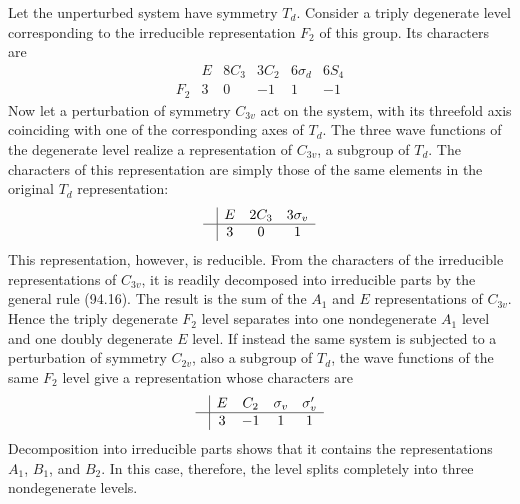 Let the unperturbed system have symmetry $T_d$. Consider a triply degenerate level corresponding to the irreducible representation $F_2$ of this group. Its characters are
\[
\begin{array}{c|ccccc}
 & E&8C_3&3C_2&6\sigma_d&6S_4\\ \hline
F_2&3&0&-1&1&-1
\end{array}
\]
Now let a perturbation of symmetry $C_{3v}$ act on the system, with its threefold axis coinciding with one of the corresponding axes of $T_d$. The three wave functions of the degenerate level realize a representation of $C_{3v}$,%
%
a subgroup of $T_d$. The characters of this representation are simply those of the same elements in the original $T_d$ representation:
\[
\begin{array}{c|ccc}
 &E&2C_3&3\sigma_v\\ \hline
 &3&0&1
\end{array}
\]
This representation, however, is reducible. From the characters of the irreducible representations of $C_{3v}$, it is readily decomposed into irreducible parts by the general rule (94.16). The result is the sum of the $A_1$ and $E$ representations of $C_{3v}$. Hence the triply degenerate $F_2$ level separates into one nondegenerate $A_1$ level and one doubly degenerate $E$ level. If instead the same system is subjected to a perturbation of symmetry $C_{2v}$, also a subgroup of $T_d$, the wave functions of the same $F_2$ level give a representation whose characters are
\[
\begin{array}{c|cccc}
 &E&C_2&\sigma_v&\sigma'_v\\ \hline
 &3&-1&1&1
\end{array}
\]
Decomposition into irreducible parts shows that it contains the representations $A_1$, $B_1$, and $B_2$. In this case, therefore, the level splits completely into three nondegenerate levels.
